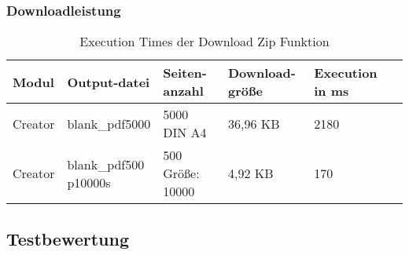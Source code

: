 \subsubsection{Downloadleistung}
\begin{table}[!htbp]
	\centering
	\begin{tabular}{|p{2cm}|p{3cm}|p{2cm}|p{2cm}|p{2cm}|p{2cm}|}
		\hline
		\textbf{Modul}		& \textbf{Output-datei}		& \textbf{Seiten-anzahl}		& \textbf{Download-größe} 		& \textbf{Execution in ms} 	\\ 
		\hline
		Creator	& blank\_pdf5000 & 5000 DIN A4 & 36,96 KB & 2180  \\
		Creator	& \parbox[t]{4cm}{blank\_pdf500\\p10000s} & 500 Größe: 10000 & 4,92 KB & 170 \\
		\hline
	\end{tabular}
	\caption{Execution Times der Download Zip Funktion}
	\label{table:download-dur}
\end{table}

\subsection{Testbewertung}